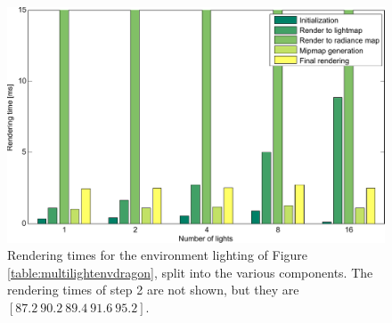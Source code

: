 \begin{figure}[!ht]
\centering
  \includegraphics[width=0.7\linewidth]{images/matlab/multiple_lights_test.pdf}

\caption{Rendering times for the environment lighting of Figure \ref{table:multilightenvdragon}, split into the various components. The rendering times of step 2 are not shown, but they are $[87.2\ 90.2\ 89.4\ 91.6\ 95.2]$.}
\label{fig:numblights}
\end{figure}
